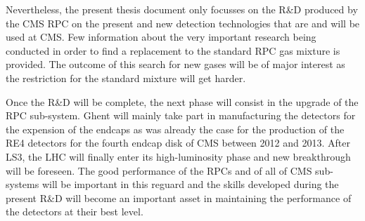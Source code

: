 	Nevertheless, the present thesis document only focusses on the R\&D produced by the CMS RPC on the present and new detection technologies that are and will be used at CMS. Few information about the very important research being conducted in order to find a replacement to the standard RPC gas mixture is provided. The outcome of this search for new gases will be of major interest as the restriction for the standard mixture will get harder.
	
	Once the R\&D will be complete, the next phase will consist in the upgrade of the RPC sub-system. Ghent will mainly take part in manufacturing the detectors for the expension of the endcaps as was already the case for the production of the RE4 detectors for the fourth endcap disk of CMS between 2012 and 2013. After LS3, the LHC will finally enter its high-luminosity phase and new breakthrough will be foreseen. The good performance of the RPCs and of all of CMS sub-systems will be important in this reguard and the skills developed during the present R\&D will become an important asset in maintaining the performance of the detectors at their best level.


\clearpage{\pagestyle{empty}\cleardoublepage}